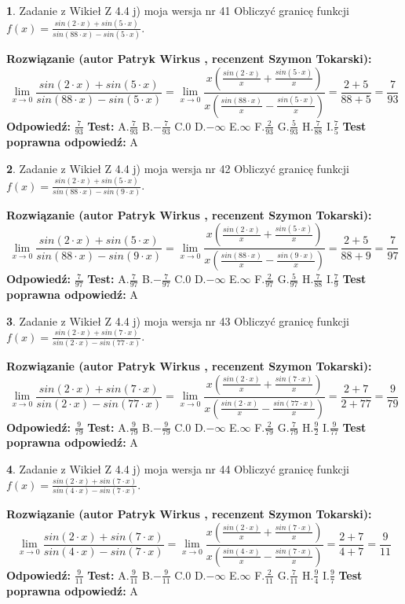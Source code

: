 \documentclass[12pt, a4paper]{article}
\theoremstyle{definition} %
\newtheorem{zad}{}
\newcommand{\zadStart}[1]{\begin{zad}#1\newline}
\newcommand{\zadStop}{\end{zad}}
\newcommand{\rozwStart}[2]{\noindent \textbf{Rozwiązanie (autor #1 , recenzent #2): }\newline}
\newcommand{\rozwStop}{\newline}
\newcommand{\odpStart}{\noindent \textbf{Odpowiedź:}\newline}
\newcommand{\odpStop}{\newline}
\newcommand{\testStart}{\noindent \textbf{Test:}\newline}
\newcommand{\testStop}{\newline}
\newcommand{\kluczStart}{\noindent \textbf{Test poprawna odpowiedź:}\newline}
\newcommand{\kluczStop}{\newline}
\begin{document}
\zadStart{Zadanie z Wikieł Z 4.4 j) moja wersja nr 41}
Obliczyć granicę funkcji $f(x)=\frac{sin(2\cdot x) +sin(5\cdot x)}{sin(88\cdot x) -sin(5\cdot x)}$.
\zadStop
\rozwStart{Patryk Wirkus}{Szymon Tokarski}
$$\lim\limits_{x\to 0}\frac{sin(2\cdot x) +sin(5\cdot x)}{sin(88\cdot x) -sin(5\cdot x)}=\lim\limits_{x\to 0}\frac{x(\frac{sin(2\cdot x)}{x}+\frac{sin(5\cdot x)}{x})}{x(\frac{sin(88\cdot x)}{x}-\frac{sin(5\cdot x)}{x})}=\frac{2+5}{88+5} = \frac{7}{93}$$
\rozwStop
\odpStart
$\frac{7}{93}$
\odpStop
\testStart
A.$\frac{7}{93}$
B.$-\frac{7}{93}$
C.$0$
D.$-\infty$
E.$\infty$
F.$\frac{2}{93}$
G.$\frac{5}{93}$
H.$\frac{7}{88}$
I.$\frac{7}{5}$
\testStop
\kluczStart
A
\kluczStop



\zadStart{Zadanie z Wikieł Z 4.4 j) moja wersja nr 42}
Obliczyć granicę funkcji $f(x)=\frac{sin(2\cdot x) +sin(5\cdot x)}{sin(88\cdot x) -sin(9\cdot x)}$.
\zadStop
\rozwStart{Patryk Wirkus}{Szymon Tokarski}
$$\lim\limits_{x\to 0}\frac{sin(2\cdot x) +sin(5\cdot x)}{sin(88\cdot x) -sin(9\cdot x)}=\lim\limits_{x\to 0}\frac{x(\frac{sin(2\cdot x)}{x}+\frac{sin(5\cdot x)}{x})}{x(\frac{sin(88\cdot x)}{x}-\frac{sin(9\cdot x)}{x})}=\frac{2+5}{88+9} = \frac{7}{97}$$
\rozwStop
\odpStart
$\frac{7}{97}$
\odpStop
\testStart
A.$\frac{7}{97}$
B.$-\frac{7}{97}$
C.$0$
D.$-\infty$
E.$\infty$
F.$\frac{2}{97}$
G.$\frac{5}{97}$
H.$\frac{7}{88}$
I.$\frac{7}{9}$
\testStop
\kluczStart
A
\kluczStop



\zadStart{Zadanie z Wikieł Z 4.4 j) moja wersja nr 43}
Obliczyć granicę funkcji $f(x)=\frac{sin(2\cdot x) +sin(7\cdot x)}{sin(2\cdot x) -sin(77\cdot x)}$.
\zadStop
\rozwStart{Patryk Wirkus}{Szymon Tokarski}
$$\lim\limits_{x\to 0}\frac{sin(2\cdot x) +sin(7\cdot x)}{sin(2\cdot x) -sin(77\cdot x)}=\lim\limits_{x\to 0}\frac{x(\frac{sin(2\cdot x)}{x}+\frac{sin(7\cdot x)}{x})}{x(\frac{sin(2\cdot x)}{x}-\frac{sin(77\cdot x)}{x})}=\frac{2+7}{2+77} = \frac{9}{79}$$
\rozwStop
\odpStart
$\frac{9}{79}$
\odpStop
\testStart
A.$\frac{9}{79}$
B.$-\frac{9}{79}$
C.$0$
D.$-\infty$
E.$\infty$
F.$\frac{2}{79}$
G.$\frac{7}{79}$
H.$\frac{9}{2}$
I.$\frac{9}{77}$
\testStop
\kluczStart
A
\kluczStop



\zadStart{Zadanie z Wikieł Z 4.4 j) moja wersja nr 44}
Obliczyć granicę funkcji $f(x)=\frac{sin(2\cdot x) +sin(7\cdot x)}{sin(4\cdot x) -sin(7\cdot x)}$.
\zadStop
\rozwStart{Patryk Wirkus}{Szymon Tokarski}
$$\lim\limits_{x\to 0}\frac{sin(2\cdot x) +sin(7\cdot x)}{sin(4\cdot x) -sin(7\cdot x)}=\lim\limits_{x\to 0}\frac{x(\frac{sin(2\cdot x)}{x}+\frac{sin(7\cdot x)}{x})}{x(\frac{sin(4\cdot x)}{x}-\frac{sin(7\cdot x)}{x})}=\frac{2+7}{4+7} = \frac{9}{11}$$
\rozwStop
\odpStart
$\frac{9}{11}$
\odpStop
\testStart
A.$\frac{9}{11}$
B.$-\frac{9}{11}$
C.$0$
D.$-\infty$
E.$\infty$
F.$\frac{2}{11}$
G.$\frac{7}{11}$
H.$\frac{9}{4}$
I.$\frac{9}{7}$
\testStop
\kluczStart
A
\kluczStop
\end{document}
